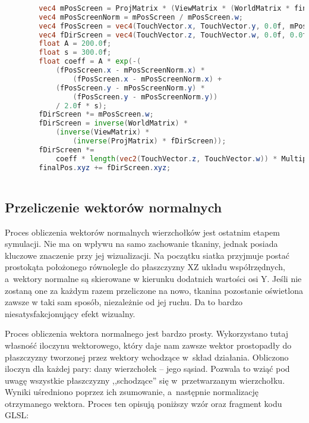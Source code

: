 		\begin{lstlisting}[language=GLSL,caption={Obliczenie reakcji tkaniny na dotyk ekranu.},label={lst_5_4}]
		
		vec4 mPosScreen = ProjMatrix * (ViewMatrix * (WorldMatrix * finalPos));
		vec4 mPosScreenNorm = mPosScreen / mPosScreen.w;
		vec4 fPosScreen = vec4(TouchVector.x, TouchVector.y, 0.0f, mPosScreenNorm.w);
		vec4 fDirScreen = vec4(TouchVector.z, TouchVector.w, 0.0f, 0.0f);
		float A = 200.0f;
		float s = 300.0f;
		float coeff = A * exp(-(
			(fPosScreen.x - mPosScreenNorm.x) * 
				(fPosScreen.x - mPosScreenNorm.x) +
			(fPosScreen.y - mPosScreenNorm.y) * 
				(fPosScreen.y - mPosScreenNorm.y)) 
			/ 2.0f * s);
		fDirScreen *= mPosScreen.w;
		fDirScreen = inverse(WorldMatrix) * 
			(inverse(ViewMatrix) * 
				(inverse(ProjMatrix) * fDirScreen));
		fDirScreen *= 
			coeff * length(vec2(TouchVector.z, TouchVector.w)) * Multipliers.x;
		finalPos.xyz += fDirScreen.xyz;
		
		\end{lstlisting}
			
		\subsection{Przeliczenie wektorów normalnych}
		\label{t:symulacja:dzialanie:normalne}
			
		
		Proces obliczenia wektorów normalnych wierzchołków jest ostatnim etapem symulacji. Nie ma on wpływu na samo zachowanie tkaniny, jednak posiada kluczowe znaczenie przy jej wizualizacji. Na początku siatka przyjmuje postać prostokąta położonego równolegle do płaszczyzny XZ układu współrzędnych, a~wektory normalne są skierowane w kierunku dodatnich wartości osi Y. Jeśli nie zostaną one za każdym razem przeliczone na nowo, tkanina pozostanie oświetlona zawsze w taki sam sposób, niezależnie od jej ruchu. Da to bardzo niesatysfakcjonujący efekt wizualny.
		
		Proces obliczenia wektora normalnego jest bardzo prosty. Wykorzystano tutaj własność iloczynu wektorowego, który daje nam zawsze wektor prostopadły do płaszczyzny tworzonej przez wektory wchodzące w~skład działania. Obliczono iloczyn dla każdej pary: dany wierzchołek -- jego sąsiad. Pozwala to wziąć pod uwagę wszystkie płaszczyzny ,,schodzące'' się w~przetwarzanym wierzchołku. Wyniki uśredniono poprzez ich zsumowanie, a~następnie normalizację otrzymanego wektora. Proces ten opisują poniższy wzór oraz fragment kodu GLSL:
		

